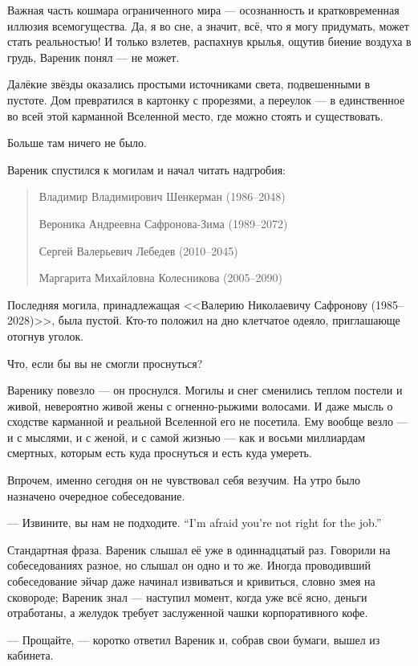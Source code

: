 Важная часть кошмара ограниченного мира --- осознанность и кратковременная иллюзия всемогущества.
Да, я во сне, а значит, всё, что я могу придумать, может стать реальностью!
И только взлетев, распахнув крылья, ощутив биение воздуха в грудь, Вареник понял --- не может.

Далёкие звёзды оказались простыми источниками света, подвешенными в пустоте.
Дом превратился в картонку с прорезями, а переулок --- в единственное во всей этой карманной Вселенной место, где можно стоять и существовать.

Больше там ничего не было.

Вареник спустился к могилам и начал читать надгробия:

\begin{quote}
Владимир Владимирович Шенкерман (1986--2048)

Вероника Андреевна Сафронова-Зима (1989--2072)

Сергей Валерьевич Лебедев (2010--2045)

Маргарита Михайловна Колесникова (2005--2090)
\end{quote}

Последняя могила, принадлежащая <<Валерию Николаевичу Сафронову (1985--2028)>>, была пустой.
Кто-то положил на дно клетчатое одеяло, приглашающе отогнув уголок.

Что, если бы вы не смогли проснуться?

Варенику повезло --- он проснулся.
Могилы и снег сменились теплом постели и живой, невероятно живой жены с огненно-рыжими волосами.
И даже мысль о сходстве карманной и реальной Вселенной его не посетила.
Ему вообще везло --- и с мыслями, и с женой, и с самой жизнью --- как и восьми миллиардам смертных, которым есть куда проснуться и есть куда умереть.

Впрочем, именно сегодня он не чувствовал себя везучим.
На утро было назначено очередное собеседование.

\asterism

{--- Извините, вы нам не подходите.}
{``I'm afraid you're not right for the job.''}

Стандартная фраза.
Вареник слышал её уже в одиннадцатый раз.
Говорили на собеседованиях разное, но слышал он одно и то же.
Иногда проводивший собеседование эйчар даже начинал извиваться и кривиться, словно змея на сковороде;
Вареник знал --- наступил момент, когда уже всё ясно, деньги отработаны, а желудок требует заслуженной чашки корпоративного кофе.

--- Прощайте, --- коротко ответил Вареник и, собрав свои бумаги, вышел из кабинета.

